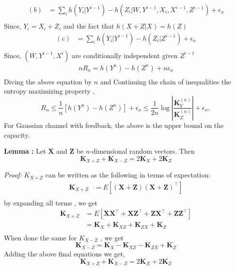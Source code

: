 \begin{align}
(b)&= \sum_i h(Y_i|Y^{i-1}) - h(Z_i|W,Y^{i-1},X_i,X^{i-1},Z^{i-1}) + \epsilon_n  \\
\end{align}
Since, $Y_i = X_i + Z_i$ and the fact that $h(X + Z|X) = h(Z)$
\begin{align}
(c)&= \sum_i h(Y_i|Y^{i-1}) - h(Z_i|Z^{i-1}) + \epsilon_n  \\
\end{align}
Since, $(W,Y^{i-1},X^i)$ are conditionally independent given $Z^{i-1}$
\begin{align}
nR_n= h(Y^n) - h(Z^n) + n\epsilon_n \\
\end{align}
Diving the above equation  by $n$ and Continuing the chain of inequalities the entropy maximizing property ,
\begin{equation}
R_n \le \frac{1}{n} [h(Y^n) - h(Z^n)] + \epsilon_n \le \frac{1}{2n} \log \left| \frac{\mathbf{K}_Y^{(n)}}{\mathbf{K}_Z^{(n)}} \right| + \epsilon_n, \label{eq:10.115}
\end{equation}
For Gaussian channel with feedback, the above is the upper bound on the capacity. 
\\
\begin{tcolorbox}[boxrule=0pt,frame hidden,sharp corners,enhanced, opacityback=0, borderline west={2pt}{0pt}{blue}]
\textbf{Lemma :} Let $\mathbf{X}$ and $\mathbf{Z}$ be $n$-dimensional random vectors. Then
\begin{equation}
\mathbf{K}_{X+Z} + \mathbf{K}_{X-Z} = 2\mathbf{K}_X + 2\mathbf{K}_Z \label{eq:10.116}
\end{equation}
\end{tcolorbox}
\textit{Proof:}
${K}_{X+Z}$ can be written as the following in terms of expectation:
\begin{align}
\mathbf{K}_{X+Z} &= E[\mathbf{(X + Z)(X + Z)}^\top] \\
\end{align}
by expanding all terms , we get
\begin{align}
\mathbf{K}_{X+Z} &=E[\mathbf{XX}^\top + \mathbf{XZ}^\top + \mathbf{ZX}^\top + \mathbf{ZZ}^\top]  \\
&= \mathbf{K}_X + \mathbf{K}_{XZ} + \mathbf{K}_{ZX} + \mathbf{K}_Z\\
\end{align}
When done the same for ${K}_{X-Z}$ , we get
\begin{equation}
\mathbf{K}_{X-Z} = \mathbf{K}_X - \mathbf{K}_{XZ} - \mathbf{K}_{ZX} + \mathbf{K}_Z \label{eq:10.120}
\end{equation}
Adding the above final equations we get,
\begin{equation}
\mathbf{K}_{X+Z} + \mathbf{K}_{X-Z} = 2\mathbf{K}_X + 2\mathbf{K}_Z \label{eq:10.116}
\end{equation}

